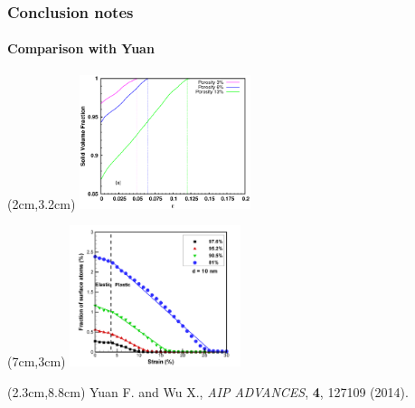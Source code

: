 \documentclass[12pt,t]{beamer}
\begin{document}
\begin{frame}
\frametitle{Conclusion notes}
\framesubtitle{Comparison with Yuan}
  \begin{textblock*}{5cm}(2cm,3.2cm) %
  \includegraphics[width=5cm]{SVF_strain_comp_dash.eps}
  \end{textblock*}
\begin{textblock*}{3cm}(7cm,3cm) %
  \includegraphics[width=5cm]{Yuan_SVF.png}
\end{textblock*}
\begin{textblock*}{12cm}(2.3cm,8.8cm) %
\tiny{Yuan F. and Wu X., \textit{AIP ADVANCES}, \textbf{4}, 127109 (2014).}
\end{textblock*}
\end{frame}
\end{document}
